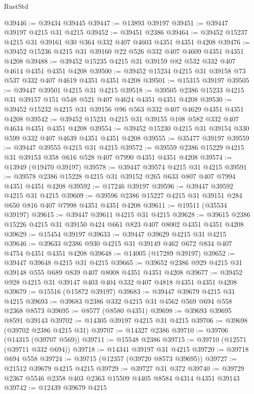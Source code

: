 \begin{lexlean}{RustStd}
\begin{coremodule}
@39446 := @39434 @39445
@39447 := @13893 @39197
@39451 := @39447 @39197 @4215 @31 @4215
@39452 := @39451 @2386
@39464 := @39452 @15237 @4215 @31 @39161 @30 @364 @332 @407 @4603 @4351 @4351 @4208
@39476 := @39452 @15236 @4215 @31 @39160 @22 @526 @332 @407 @4609 @4351 @4351 @4208
@39488 := @39452 @15235 @4215 @31 @39159 @82 @532 @332 @407 @4614 @4351 @4351 @4208
@39500 := @39452 @15234 @4215 @31 @39158 @73 @537 @332 @407 @4619 @4351 @4351 @4208
@39501 := @15315 @39197
@39505 := @39447 @39501 @4215 @31 @4215
@39518 := @39505 @2386 @15233 @4215 @31 @39157 @151 @548 @521 @407 @4624 @4351 @4351 @4208
@39530 := @39452 @15232 @4215 @31 @39156 @96 @563 @332 @407 @4629 @4351 @4351 @4208
@39542 := @39452 @15231 @4215 @31 @39155 @108 @582 @332 @407 @4634 @4351 @4351 @4208
@39554 := @39452 @15230 @4215 @31 @39154 @330 @599 @332 @407 @4639 @4351 @4351 @4208
@39555 := @35477 @39197
@39559 := @39447 @39555 @4215 @31 @4215
@39572 := @39559 @2386 @15229 @4215 @31 @39153 @358 @616 @528 @407 @7990 @4351 @4351 @4208
@39574 := @13949 (@19470 @39197)
@39578 := @39447 @39574 @4215 @31 @4215
@39591 := @39578 @2386 @15228 @4215 @31 @39152 @265 @633 @807 @407 @7994 @4351 @4351 @4208
@39592 := @17246 @39197
@39596 := @39447 @39592 @4215 @31 @4215
@39609 := @39596 @2386 @15227 @4215 @31 @39151 @284 @650 @816 @407 @7998 @4351 @4351 @4208
@39611 := @19511 (@35534 @39197)
@39615 := @39447 @39611 @4215 @31 @4215
@39628 := @39615 @2386 @15226 @4215 @31 @39150 @424 @661 @823 @407 @8002 @4351 @4351 @4208
@39629 := @15454 @39197
@39633 := @39447 @39629 @4215 @31 @4215
@39646 := @39633 @2386 @930 @4215 @31 @39149 @462 @672 @834 @407 @4754 @4351 @4351 @4208
@39648 := @14005 (@17289 @39197)
@39652 := @39447 @39648 @4215 @31 @4215
@39665 := @39652 @2386 @929 @4215 @31 @39148 @555 @689 @839 @407 @8008 @4351 @4351 @4208
@39677 := @39452 @928 @4215 @31 @39147 @403 @404 @332 @407 @4818 @4351 @4351 @4208
@39679 := @15516 (@15872 @39197)
@39683 := @39447 @39679 @4215 @31 @4215
@39693 := @39683 @2386 @332 @4215 @31 @4562 @569 @694 @558 @2368 @8573
@39695 := @8577 (@8580 @4351)
@39698 := @39693 @39695 @8591 @39143
@39702 := @14305 @39197 @4215 @31 @4215
@39706 := @39698 (@39702 @2386 @4215 @31)
@39707 := @14327 @2386
@39710 := @39706 (@14315 (@39707 @569))
@39711 := @15548 @2386
@39715 := @39710 (@12571 (@39711 @332 @694))
@39718 := @14341 @39197 @31 @4215
@39720 := @39718 @694 @558
@39724 := @39715 (@12357 (@39720 @8573 @39695))
@39727 := @21512 @39679 @4215 @4215
@39729 := @39727 @31 @372
@39740 := @39729 @2367 @5546 @2358 @403 @2363 @15509 @4405 @8584 @4314 @4351 @39143
@39742 := @12439 @39679 @4215

\end{coremodule}
\end{lexlean}

